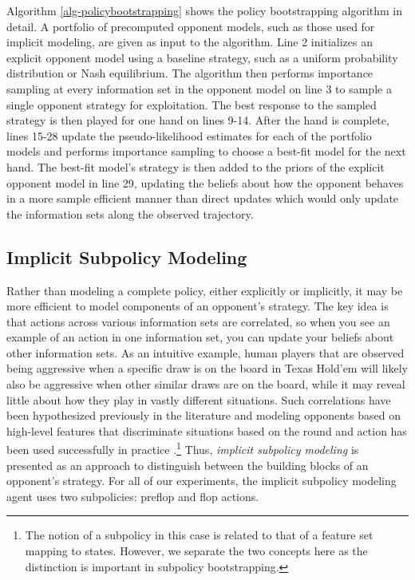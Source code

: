 \documentclass{aamas2013}
\begin{document}
    Algorithm \ref{alg-policybootstrapping} shows the policy bootstrapping algorithm in detail. A portfolio of precomputed opponent models, such as those used for implicit modeling, are given as input to the algorithm. Line 2 initializes an explicit opponent model using a baseline strategy, such as a uniform probability distribution or Nash equilibrium. The algorithm then performs importance sampling at every information set in the opponent model on line 3 to sample a single opponent strategy for exploitation. The best response to the sampled strategy is then played for one hand on lines 9-14. After the hand is complete, lines 15-28 update the pseudo-likelihood estimates for each of the portfolio models and performs importance sampling to choose a best-fit model for the next hand. The best-fit model's strategy is then added to the priors of the explicit opponent model in line 29, updating the beliefs about how the opponent behaves in a more sample efficient manner than direct updates which would only update the information sets along the observed trajectory.

    \subsection{Implicit Subpolicy Modeling}
    Rather than modeling a complete policy, either explicitly or implicitly, it may be more efficient to model components of an opponent's strategy. The key idea is that actions across various information sets are correlated, so when you see an example of an action in one information set, you can update your beliefs about other information sets. As an intuitive example, human players that are observed being aggressive when a specific draw is on the board in Texas Hold'em will likely also be aggressive when other similar draws are on the board, while it may reveal little about how they play in vastly different situations. Such correlations have been hypothesized previously in the literature \cite{bayesbluff,shortterm} and modeling opponents based on high-level features that discriminate situations based on the round and action has been used successfully in practice \cite{ponsen2009evolutionary}.\footnote{The notion of a subpolicy in this case is related to that of a feature set mapping to states. However, we separate the two concepts here as the distinction is important in subpolicy bootstrapping.} Thus, \textit{implicit subpolicy modeling} is presented as an approach to distinguish between the building blocks of an opponent's strategy. For all of our experiments, the implicit subpolicy modeling agent uses two subpolicies: preflop and flop actions.
\end{document}
